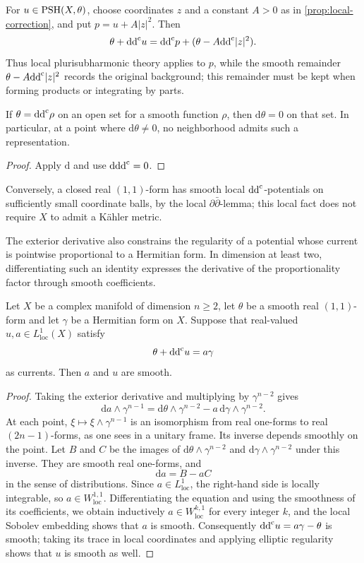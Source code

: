 For $u\in\mathrm{PSH}(X,\theta)$, choose coordinates $z$ and a constant $A>0$ as in \cref{prop:local-correction}, and put $p=u+A|z|^2$. Then
\[
 \theta+\mathrm{dd}^{\mathrm{c}} u=\mathrm{dd}^{\mathrm{c}} p+(\theta-A\mathrm{dd}^{\mathrm{c}}|z|^2).
\]
Thus local plurisubharmonic theory applies to $p$, while the smooth remainder $\theta-A\mathrm{dd}^{\mathrm{c}}|z|^2$ records the original background; this remainder must be kept when forming products or integrating by parts.

\begin{proposition}\label{prop:no-local-potential}
If $\theta=\mathrm{dd}^{\mathrm{c}}\rho$ on an open set for a smooth function $\rho$, then $\mathrm{d}\theta=0$ on that set. In particular, at a point where $\mathrm{d}\theta\neq0$, no neighborhood admits such a representation.
\end{proposition}
\begin{proof}
Apply $\mathrm{d}$ and use $\mathrm{d}\mathrm{dd}^{\mathrm{c}}=0$.
\end{proof}

Conversely, a closed real $(1,1)$-form has smooth local $\mathrm{dd}^{\mathrm{c}}$-potentials on sufficiently small coordinate balls, by the local $\partial\bar\partial$-lemma; this local fact does not require $X$ to admit a K\"ahler metric.

The exterior derivative also constrains the regularity of a potential whose current is pointwise proportional to a Hermitian form. In dimension at least two, differentiating such an identity expresses the derivative of the proportionality factor through smooth coefficients.

\begin{lemma}\label{lem:smooth-conformal-current}
Let $X$ be a complex manifold of dimension $n\geq2$, let $\theta$ be a smooth real $(1,1)$-form and let $\gamma$ be a Hermitian form on $X$. Suppose that real-valued $u,a\in L^1_{\mathrm{loc}}(X)$ satisfy
\[
 \theta+\mathrm{dd}^{\mathrm{c}} u=a\gamma
\]
as currents. Then $a$ and $u$ are smooth.
\end{lemma}
\begin{proof}
Taking the exterior derivative and multiplying by $\gamma^{n-2}$ gives
\[
 \mathrm{d}a\wedge\gamma^{n-1}
 =\mathrm{d}\theta\wedge\gamma^{n-2}
      -a\,\mathrm{d}\gamma\wedge\gamma^{n-2}.
\]
At each point, $\xi\mapsto\xi\wedge\gamma^{n-1}$ is an isomorphism from real one-forms to real $(2n-1)$-forms, as one sees in a unitary frame. Its inverse depends smoothly on the point. Let $B$ and $C$ be the images of $\mathrm{d}\theta\wedge\gamma^{n-2}$ and $\mathrm{d}\gamma\wedge\gamma^{n-2}$ under this inverse. They are smooth real one-forms, and
\[
 \mathrm{d}a=B-aC
\]
in the sense of distributions. Since $a\in L^1_{\mathrm{loc}}$, the right-hand side is locally integrable, so $a\in W^{1,1}_{\mathrm{loc}}$. Differentiating the equation and using the smoothness of its coefficients, we obtain inductively $a\in W^{k,1}_{\mathrm{loc}}$ for every integer $k$, and the local Sobolev embedding shows that $a$ is smooth. Consequently $\mathrm{dd}^{\mathrm{c}} u=a\gamma-\theta$ is smooth; taking its trace in local coordinates and applying elliptic regularity shows that $u$ is smooth as well.
\end{proof}

